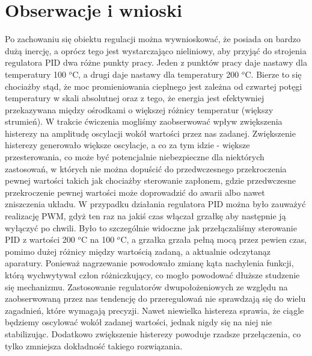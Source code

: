\documentclass[a4paper, 12pt]{article}
\begin{document}
		\section{Obserwacje i wnioski}
			Po zachowaniu się obiektu regulacji można wywnioskować, że posiada on bardzo dużą inercję, a oprócz tego jest wystarczająco nieliniowy, aby przyjąć do strojenia regulatora PID dwa różne punkty pracy. Jeden z punktów pracy daje nastawy dla temperatury 100 $^o$C, a drugi daje nastawy dla temperatury 200 $^o$C. Bierze to się chociażby stąd, że moc promieniowania cieplnego jest zależna od czwartej potęgi temperatury w skali absolutnej oraz z tego, że energia jest efektywniej przekazywana między ośrodkami o większej różnicy temperatur (większy strumień).
			\newline
			\newline
			W trakcie ćwiczenia mogliśmy zaobserwować wpływ zwiększenia histerezy na amplitudę oscylacji wokół wartości przez nas zadanej. Zwiększenie histerezy generowało większe oscylacje, a co za tym idzie - większe przesterowania, co może być potencjalnie niebezpieczne dla niektórych zastosowań, w których nie można dopuścić do przedwczesnego przekroczenia pewnej wartości takich jak chociażby sterowanie zapłonem, gdzie przedwczesne przekroczenie pewnej wartości może doprowadzić do awarii albo nawet zniszczenia układu.
			\newline 
			\newline 
			W przypadku działania regulatora PID można było zauważyć realizację PWM, gdyż ten raz na jakiś czas włączał grzałkę aby następnie ją wyłączyć po chwili. Było to szczególnie widoczne jak przełączaliśmy sterowanie PID z wartości 200 $^o$C na 100 $^o$C, a grzałka grzała pełną mocą przez pewien czas, pomimo dużej różnicy między wartością zadaną, a aktualnie odczytaną\linebreak z aparatury. Ponieważ nagrzewanie powodowało zmianę kąta nachylenia funkcji, którą wychwytywał człon różniczkujący, co mogło powodować dłuższe studzenie się mechanizmu.
			\newline 
			\newline 
			Zastosowanie regulatorów dwupołożeniowych ze względu na zaobserwowaną przez nas tendencję do przeregulowań nie sprawdzają się do wielu zagadnień, które wymagają precyzji. Nawet niewielka histereza sprawia, że ciągle będziemy oscylować wokół zadanej wartości, jednak nigdy się na niej nie stabilizując. Dodatkowo zwiększenie histerezy powoduje rzadsze przełączenia, co tylko zmniejsza dokładność takiego rozwiązania. 
			\newline 
\end{document}
